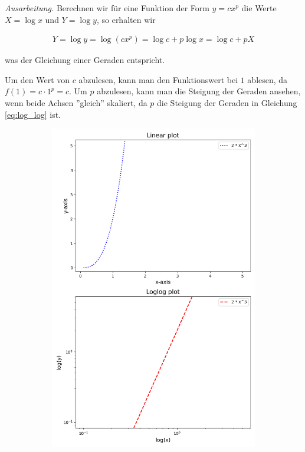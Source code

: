 \documentclass[titlepage]{article}
\newenvironment{ausarbeitung}{\vspace{3mm}\noindent\textit{Ausarbeitung.}}{}
\begin{document}
\begin{ausarbeitung}
	Berechnen wir für eine Funktion der Form $y=cx^p$ die Werte $X=\log x$ und $Y = \log y$, so erhalten wir
	
	\begin{align}\label{eq:log_log}
		Y = \log y = \log(c x^p) = \log c + p \log x = \log c + p X
	\end{align}

	was der Gleichung einer Geraden entspricht.

	Um den Wert von $c$ abzulesen, kann man den Funktionswert bei $1$ ablesen, da $f(1) = c \cdot 1^p = c$. Um $p$ abzulesen, kann man die Steigung der Geraden ansehen, wenn beide Achsen ''gleich'' skaliert, da $p$ die Steigung der Geraden in Gleichung \ref{eq:log_log} ist.
	
	\begin{figure}
		\centering
		\begin{subfigure}{0.46\textwidth}
			\includegraphics[width=\textwidth]{images/loglog_plot_a}

\end{subfigure}
\end{figure}
\end{ausarbeitung}
\end{document}
